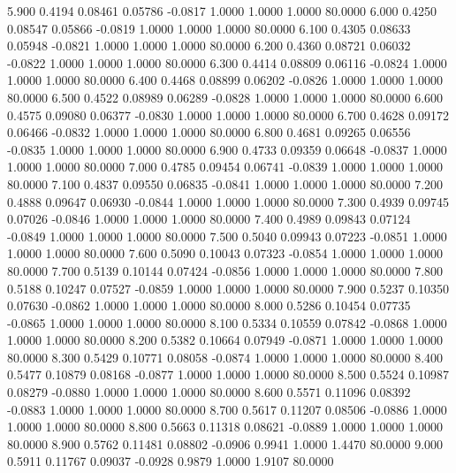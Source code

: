    5.900   0.4194   0.08461   0.05786  -0.0817   1.0000   1.0000   1.0000  80.0000
   6.000   0.4250   0.08547   0.05866  -0.0819   1.0000   1.0000   1.0000  80.0000
   6.100   0.4305   0.08633   0.05948  -0.0821   1.0000   1.0000   1.0000  80.0000
   6.200   0.4360   0.08721   0.06032  -0.0822   1.0000   1.0000   1.0000  80.0000
   6.300   0.4414   0.08809   0.06116  -0.0824   1.0000   1.0000   1.0000  80.0000
   6.400   0.4468   0.08899   0.06202  -0.0826   1.0000   1.0000   1.0000  80.0000
   6.500   0.4522   0.08989   0.06289  -0.0828   1.0000   1.0000   1.0000  80.0000
   6.600   0.4575   0.09080   0.06377  -0.0830   1.0000   1.0000   1.0000  80.0000
   6.700   0.4628   0.09172   0.06466  -0.0832   1.0000   1.0000   1.0000  80.0000
   6.800   0.4681   0.09265   0.06556  -0.0835   1.0000   1.0000   1.0000  80.0000
   6.900   0.4733   0.09359   0.06648  -0.0837   1.0000   1.0000   1.0000  80.0000
   7.000   0.4785   0.09454   0.06741  -0.0839   1.0000   1.0000   1.0000  80.0000
   7.100   0.4837   0.09550   0.06835  -0.0841   1.0000   1.0000   1.0000  80.0000
   7.200   0.4888   0.09647   0.06930  -0.0844   1.0000   1.0000   1.0000  80.0000
   7.300   0.4939   0.09745   0.07026  -0.0846   1.0000   1.0000   1.0000  80.0000
   7.400   0.4989   0.09843   0.07124  -0.0849   1.0000   1.0000   1.0000  80.0000
   7.500   0.5040   0.09943   0.07223  -0.0851   1.0000   1.0000   1.0000  80.0000
   7.600   0.5090   0.10043   0.07323  -0.0854   1.0000   1.0000   1.0000  80.0000
   7.700   0.5139   0.10144   0.07424  -0.0856   1.0000   1.0000   1.0000  80.0000
   7.800   0.5188   0.10247   0.07527  -0.0859   1.0000   1.0000   1.0000  80.0000
   7.900   0.5237   0.10350   0.07630  -0.0862   1.0000   1.0000   1.0000  80.0000
   8.000   0.5286   0.10454   0.07735  -0.0865   1.0000   1.0000   1.0000  80.0000
   8.100   0.5334   0.10559   0.07842  -0.0868   1.0000   1.0000   1.0000  80.0000
   8.200   0.5382   0.10664   0.07949  -0.0871   1.0000   1.0000   1.0000  80.0000
   8.300   0.5429   0.10771   0.08058  -0.0874   1.0000   1.0000   1.0000  80.0000
   8.400   0.5477   0.10879   0.08168  -0.0877   1.0000   1.0000   1.0000  80.0000
   8.500   0.5524   0.10987   0.08279  -0.0880   1.0000   1.0000   1.0000  80.0000
   8.600   0.5571   0.11096   0.08392  -0.0883   1.0000   1.0000   1.0000  80.0000
   8.700   0.5617   0.11207   0.08506  -0.0886   1.0000   1.0000   1.0000  80.0000
   8.800   0.5663   0.11318   0.08621  -0.0889   1.0000   1.0000   1.0000  80.0000
   8.900   0.5762   0.11481   0.08802  -0.0906   0.9941   1.0000   1.4470  80.0000
   9.000   0.5911   0.11767   0.09037  -0.0928   0.9879   1.0000   1.9107  80.0000

